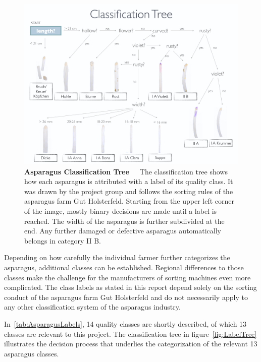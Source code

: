 \begin{figure}[!b]
	\centering
	\includegraphics[scale=0.39]{Figures/chapter01/treewithtitle.png}
	\decoRule
	\caption[Asparagus Classification Tree]{\textbf{Asparagus Classification Tree}~~~The classification tree shows how each asparagus is attributed with a label of its quality class. It was drawn by the project group and follows the sorting rules of the asparagus farm Gut Holsterfeld. Starting from the upper left corner of the image, mostly binary decisions are made until a label is reached. The width of the asparagus is further subdivided at the end. Any further damaged or defective asparagus automatically belongs in category II B.}
	\label{fig:LabelTree}
\end{figure}

\bigskip
Depending on how carefully the individual farmer further categorizes the asparagus, additional classes can be established. Regional differences to those classes make the challenge for the manufacturers of sorting machines even more complicated. The class labels as stated in this report depend solely on the sorting conduct of the asparagus farm Gut Holsterfeld and do not necessarily apply to any other classification system of the asparagus industry.

In~\autoref{tab:AsparagusLabels}, 14 quality classes are shortly described, of which 13 classes are relevant to this project. The classification tree in figure~\autoref{fig:LabelTree} illustrates the decision process that underlies the categorization of the relevant 13 asparagus classes.

